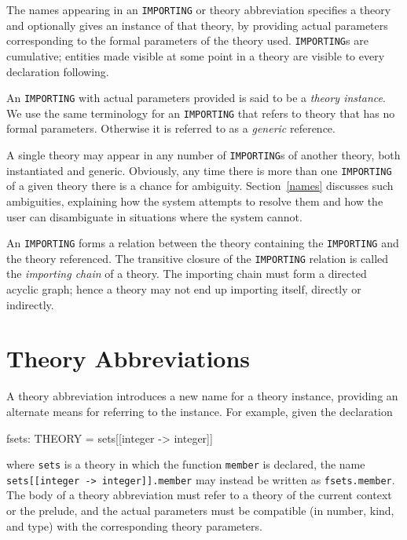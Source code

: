 The names appearing in an \texttt{IMPORTING} or theory abbreviation specifies a
theory and optionally gives an instance of that theory, by providing
actual parameters corresponding to the formal parameters of the theory
used.  \texttt{IMPORTING}s are cumulative; entities made visible at some point
in a theory are visible to every declaration following.

An \texttt{IMPORTING} with actual parameters provided is said to be a \emph{
theory instance}. We use the same terminology for
an \texttt{IMPORTING} that refers to theory that has no formal parameters.
Otherwise it is referred to as a \emph{generic}
reference.

A single theory may appear in any number of \texttt{IMPORTING}s of another
theory, both instantiated and generic.  Obviously, any time there is
more than one \texttt{IMPORTING} of a given theory there is a chance for
ambiguity.  Section~\ref{names} discusses such ambiguities, explaining
how the system attempts to resolve them and how the user can
disambiguate in situations where the system cannot.

An \texttt{IMPORTING} forms a relation between the theory containing the
\texttt{IMPORTING} and the theory referenced.  The transitive closure of
the \texttt{IMPORTING} relation is called the \emph{importing chain} of a
theory.  The importing chain must form a directed acyclic graph; hence a
theory may not end up importing itself, directly or indirectly.


\section{Theory Abbreviations}\label{theory-abbreviations}

A theory abbreviation introduces a new name for a theory instance,
providing an alternate means for referring to the instance.  For
example, given the declaration
\begin{pvsex}
  fsets: THEORY = sets[[integer -> integer]]
\end{pvsex}
where \texttt{sets} is a theory in which the function \texttt{member} is
declared, the name \texttt{sets[[integer -> integer]].member} may instead
be written as \texttt{fsets.member}.  The body of a theory abbreviation
must refer to a theory of the current context or the prelude, and the
actual parameters must be compatible (in number, kind, and type) with
the corresponding theory parameters.

